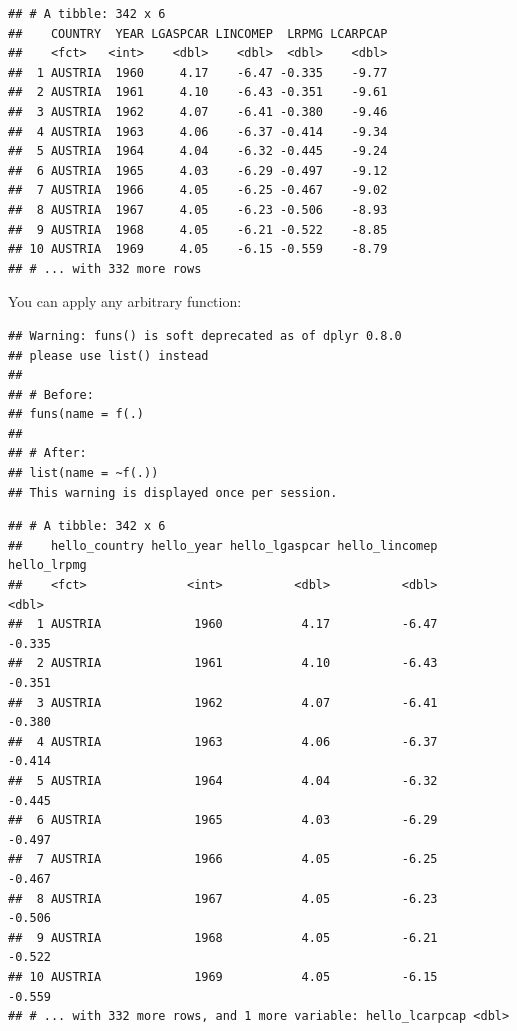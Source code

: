 \documentclass[]{gitbook}
\newenvironment{Shaded}{\begin{snugshade}}{\end{snugshade}}
\newcommand{\KeywordTok}[1]{\textcolor[rgb]{0.13,0.29,0.53}{\textbf{#1}}}
\newcommand{\NormalTok}[1]{#1}
\newcommand{\OperatorTok}[1]{\textcolor[rgb]{0.81,0.36,0.00}{\textbf{#1}}}
\newcommand{\StringTok}[1]{\textcolor[rgb]{0.31,0.60,0.02}{#1}}
\begin{document}
\begin{verbatim}
## # A tibble: 342 x 6
##    COUNTRY  YEAR LGASPCAR LINCOMEP  LRPMG LCARPCAP
##    <fct>   <int>    <dbl>    <dbl>  <dbl>    <dbl>
##  1 AUSTRIA  1960     4.17    -6.47 -0.335    -9.77
##  2 AUSTRIA  1961     4.10    -6.43 -0.351    -9.61
##  3 AUSTRIA  1962     4.07    -6.41 -0.380    -9.46
##  4 AUSTRIA  1963     4.06    -6.37 -0.414    -9.34
##  5 AUSTRIA  1964     4.04    -6.32 -0.445    -9.24
##  6 AUSTRIA  1965     4.03    -6.29 -0.497    -9.12
##  7 AUSTRIA  1966     4.05    -6.25 -0.467    -9.02
##  8 AUSTRIA  1967     4.05    -6.23 -0.506    -8.93
##  9 AUSTRIA  1968     4.05    -6.21 -0.522    -8.85
## 10 AUSTRIA  1969     4.05    -6.15 -0.559    -8.79
## # ... with 332 more rows
\end{verbatim}

You can apply any arbitrary function:

\begin{Shaded}
\end{Shaded}

\begin{verbatim}
## Warning: funs() is soft deprecated as of dplyr 0.8.0
## please use list() instead
## 
## # Before:
## funs(name = f(.)
## 
## # After: 
## list(name = ~f(.))
## This warning is displayed once per session.
\end{verbatim}

\begin{verbatim}
## # A tibble: 342 x 6
##    hello_country hello_year hello_lgaspcar hello_lincomep hello_lrpmg
##    <fct>              <int>          <dbl>          <dbl>       <dbl>
##  1 AUSTRIA             1960           4.17          -6.47      -0.335
##  2 AUSTRIA             1961           4.10          -6.43      -0.351
##  3 AUSTRIA             1962           4.07          -6.41      -0.380
##  4 AUSTRIA             1963           4.06          -6.37      -0.414
##  5 AUSTRIA             1964           4.04          -6.32      -0.445
##  6 AUSTRIA             1965           4.03          -6.29      -0.497
##  7 AUSTRIA             1966           4.05          -6.25      -0.467
##  8 AUSTRIA             1967           4.05          -6.23      -0.506
##  9 AUSTRIA             1968           4.05          -6.21      -0.522
## 10 AUSTRIA             1969           4.05          -6.15      -0.559
## # ... with 332 more rows, and 1 more variable: hello_lcarpcap <dbl>
\end{verbatim}
\end{document}
